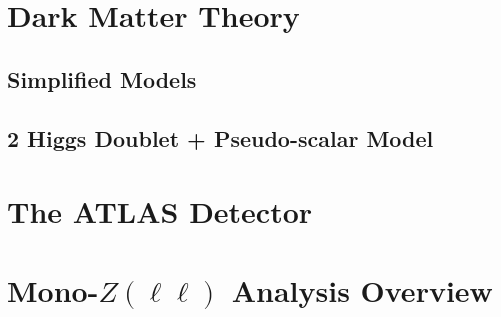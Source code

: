 \label{chapter:theory}

\section{Dark Matter Theory}

\subsection{Simplified Models}

\subsection{2 Higgs Doublet + Pseudo-scalar Model}

\section{The ATLAS Detector}

\section{Mono-$Z(\ell\ell)$ Analysis Overview}